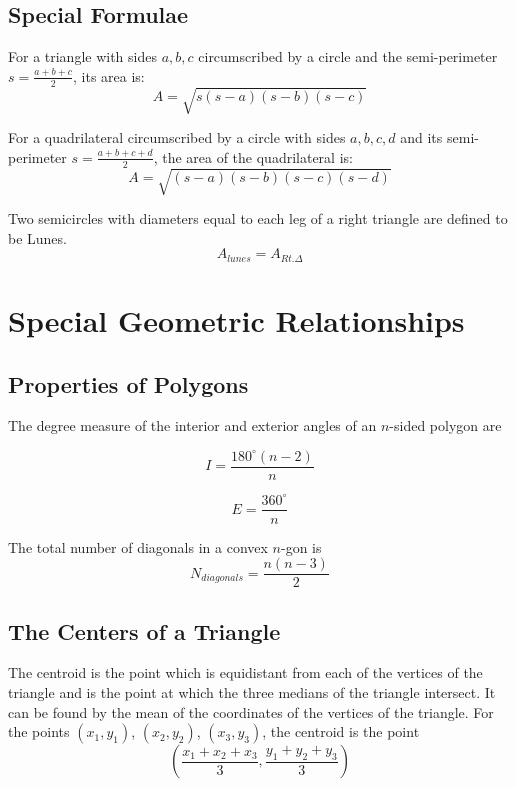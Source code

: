 \documentclass[final, letterpaper, 12pt]{article}
\begin{document}
	\subsection{Special Formulae}\label{sec: Heron's and Brahmagupta's Formulae, Lunes}
	
		For a triangle with sides $a, b, c$ circumscribed by a circle and the semi-perimeter $s = \frac{a+b+c}{2}$, its area is:
		\begin{equation}
			A = \sqrt{s(s-a)(s-b)(s-c)}
		\end{equation}
		
		For a quadrilateral circumscribed by a circle with sides $a, b, c, d$ and its semi-perimeter $s = \frac{a+b+c+d}{2}$, the area of the quadrilateral is:
		\begin{equation}
			A = \sqrt{(s-a)(s-b)(s-c)(s-d)}
		\end{equation}
		
		Two semicircles with diameters equal to each leg of a right triangle are defined to be Lunes.
		\begin{equation}
			A_{lunes} = A_{Rt.\Delta}
		\end{equation}
		
\section{Special Geometric Relationships}
	\subsection{Properties of Polygons}\label{sec: information about angles, diagonals, and other aspects of polygons}
	The degree measure of the interior and exterior angles of an $n$-sided polygon are
	
		\begin{equation}
			I = \frac{180^{\circ}(n-2)}{n}
		\end{equation}
		
		\begin{equation}
			E = \frac{360^{\circ}}{n}
		\end{equation}
		
	The total number of diagonals in a convex $n$-gon is
	\begin{equation}
			N_{diagonals} = \frac {n(n-3)}{2}
		\end{equation}
	
	
	\subsection{The Centers of a Triangle}\label{sec: looking at the centroid, orthocenter, circumcenter, and incenter of a triangle}
		The centroid is the point which is equidistant from each of the vertices of the triangle and is the point at which the three medians of the triangle intersect. It can be found by the mean of the coordinates of the vertices of the triangle. For the points $(x_1, y_1)$, $(x_2, y_2)$, $(x_3, y_3)$, the centroid is the point
		\begin{equation}
			\left(\frac{x_1 + x_2 + x_3}{3}, \frac{y_1 + y_2 + y_3}{3} \right)
		\end{equation}
\end{document}
